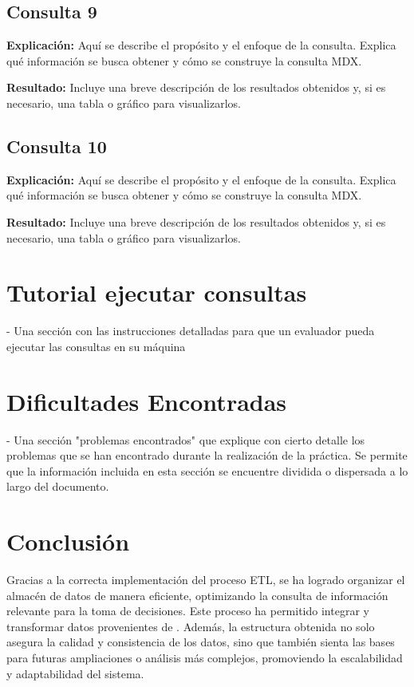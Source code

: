 \documentclass{article}
\begin{document}
\subsection{Consulta 9}

\textbf{Explicación:}  
Aquí se describe el propósito y el enfoque de la consulta. Explica qué información se busca obtener y cómo se construye la consulta MDX.

\textbf{Resultado:}  
Incluye una breve descripción de los resultados obtenidos y, si es necesario, una tabla o gráfico para visualizarlos.

\subsection{Consulta 10}

\textbf{Explicación:}  
Aquí se describe el propósito y el enfoque de la consulta. Explica qué información se busca obtener y cómo se construye la consulta MDX.

\textbf{Resultado:}  
Incluye una breve descripción de los resultados obtenidos y, si es necesario, una tabla o gráfico para visualizarlos.


\section{Tutorial ejecutar consultas}


	 - Una sección con las instrucciones detalladas para que un evaluador pueda ejecutar las consultas en su máquina
	\section{Dificultades Encontradas}
	\label{sec:dificultades_encontradas}
	  - Una sección "problemas encontrados" que explique con cierto detalle los problemas que se han encontrado durante la realización de la práctica. Se permite que la información incluida en esta sección se encuentre dividida o dispersada a lo largo del documento. 

	\section{Conclusión}
	\label{sec:conclusion}
	
	Gracias a la correcta implementación del proceso ETL, se ha logrado organizar el almacén de datos de manera eficiente, optimizando la consulta de información relevante para la toma de decisiones. Este proceso ha permitido integrar y transformar datos provenientes de \cite{eicu_crd}. Además, la estructura obtenida no solo asegura la calidad y consistencia de los datos, sino que también sienta las bases para futuras ampliaciones o análisis más complejos, promoviendo la escalabilidad y adaptabilidad del sistema.
	
\end{document}
